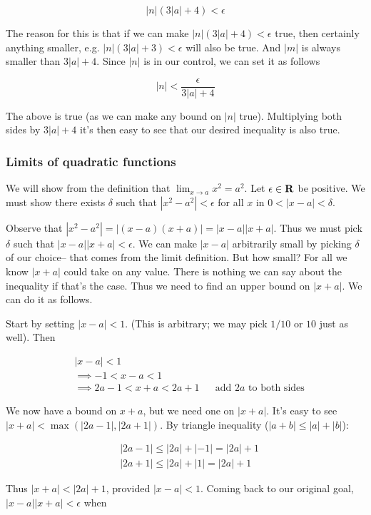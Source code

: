 \[|n|(3|a|+4)<\epsilon\]

The reason for this is that if we can make $|n|(3|a|+4)<\epsilon$ true, then
certainly anything smaller, e.g. $|n|(3|a|+3)<\epsilon$ will also be true.
And $|m|$ is always smaller than $3|a|+4$. Since $|n|$ is in our
control, we can set it as follows

\[|n|<\frac{\epsilon}{3|a|+4}\]

The above is true (as we can make any bound on $|n|$ true).
Multiplying both sides by $3|a|+4$ it's then easy to see that our
desired inequality is also true.

\subsubsection*{Limits of quadratic functions}

We will show from the definition that $\lim_{x\to a}x^2=a^2$. Let
$\epsilon\in\mathbf{R}$ be positive. We must show there exists $\delta$ such that
$|x^2-a^2|<\epsilon$ for all $x$ in $0<|x-a|<\delta$.

\vs

Observe that $|x^2-a^2|=|(x-a)(x+a)|=|x-a||x+a|$. Thus we must pick
$\delta$ such that $|x-a||x+a|<\epsilon$. We can make $|x-a|$ arbitrarily small by
picking $\delta$ of our choice-- that comes from the limit definition. But
how small? For all we know $|x+a|$ could take on any value. There is
nothing we can say about the inequality if that's the case. Thus we
need to find an upper bound on $|x+a|$. We can do it as follows.

\vs

Start by setting $|x-a|<1$. (This is arbitrary; we may pick $1/10$ or
$10$ just as well). Then

\begin{align*}
    &|x-a|<1\\
    &\implies -1<x-a<1\\
    &\implies 2a-1<x+a<2a+1&&\text{add $2a$ to both sides}
\end{align*}

We now have a bound on $x+a$, but we need one on $|x+a|$. It's easy to
see $|x+a|<\max(|2a-1|, |2a+1|)$. By triangle inequality
($|a+b|\leq|a|+|b|$):

\begin{align*}
    &|2a-1|\leq|2a|+|-1|=|2a|+1\\
    &|2a+1|\leq|2a|+|1|=|2a|+1
\end{align*}

Thus $|x+a|<|2a|+1$, provided $|x-a|<1$. Coming back to our original
goal, $|x-a||x+a|<\epsilon$ when


